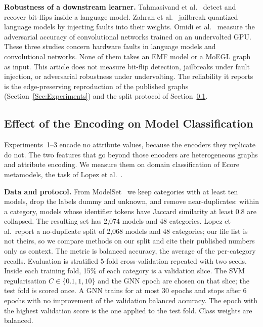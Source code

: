 \documentclass[journal,article,submit,moreauthors,technologies]{Definitions/mdpi}
\newcommand{\rev}[1]{#1}
\begin{document}
\rev{\textbf{Robustness of a downstream learner.} Tahmasivand et al.~\cite{tahmasivand2025lmfix} detect and recover bit-flips inside a language model. Zahran et al.~\cite{zahran2025jailbreak} jailbreak quantized language models by injecting faults into their weights. Omidi et al.~\cite{omidi2026undervolting} measure the adversarial accuracy of convolutional networks trained on an undervolted GPU. These three studies concern hardware faults in language models and convolutional networks. None of them takes an EMF model or a MoEGL graph as input. This article does not measure bit-flip detection, jailbreaks under fault injection, or adversarial robustness under undervolting. The reliability it reports is the edge-preserving reproduction of the published graphs (Section~\ref{Sec:Experiments}) and the split protocol of Section~\ref{sec:learning}.}


\subsection{\rev{Effect of the Encoding on Model Classification}}\label{sec:learning}

\rev{Experiments~1--3 encode no attribute values, because the encoders they replicate do not. The two features that go beyond those encoders are heterogeneous graphs and attribute encoding. We measure them on domain classification of Ecore metamodels, the task of Lopez et al.~\cite{lopez2022classification}.}

\rev{\textbf{Data and protocol.} From ModelSet~\cite{lopez2022modelset} we keep categories with at least ten models, drop the labels dummy and unknown, and remove near-duplicates: within a category, models whose identifier tokens have Jaccard similarity at least 0.8 are collapsed. The resulting set has 2{,}074 models and 48 categories. Lopez et al.\ report a no-duplicate split of 2{,}068 models and 48 categories; our file list is not theirs, so we compare methods on our split and cite their published numbers only as context. The metric is balanced accuracy, the average of the per-category recalls. Evaluation is stratified 5-fold cross-validation repeated with two seeds. Inside each training fold, 15\% of each category is a validation slice. The SVM regularisation $C\in\{0.1,1,10\}$ and the GNN epoch are chosen on that slice; the test fold is scored once. A GNN trains for at most 30 epochs and stops after 6 epochs with no improvement of the validation balanced accuracy. The epoch with the highest validation score is the one applied to the test fold. Class weights are balanced.}
\end{document}
